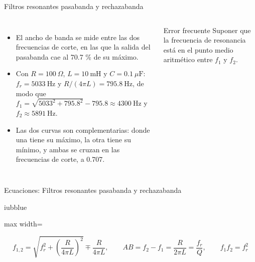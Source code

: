 \documentclass[aspectratio=169,11pt,xcolor={table}]{beamer}
\begin{document}
\begin{frame}{Filtros resonantes pasabanda y rechazabanda}
\begin{columns}[c,onlytextwidth]
\small
\begin{itemize}\setlength{\itemsep}{4pt}
  \item El ancho de banda se mide entre las dos frecuencias de corte, en las que la salida del pasabanda cae al 70.7 \% de su máximo.
  \item Con $R = 100\ \Omega$, $L = 10\ \text{mH}$ y $C = 0.1\ \mu\text{F}$: $f_r = 5033\ \text{Hz}$ y $R/(4\pi L) = 795.8\ \text{Hz}$, de modo que $f_1 = \sqrt{5033^2 + 795.8^2} - 795.8 \approx 4300\ \text{Hz}$ y $f_2 \approx 5891\ \text{Hz}$.
  \item Las dos curvas son complementarias: donde una tiene su máximo, la otra tiene su mínimo, y ambas se cruzan en las frecuencias de corte, a 0.707.
\end{itemize}
\begin{cardO}{Error frecuente}
\footnotesize Suponer que la frecuencia de resonancia está en el punto medio aritmético entre $f_1$ y $f_2$.
\end{cardO}
\end{columns}
\end{frame}

\begin{frame}{{\normalsize Ecuaciones: Filtros resonantes pasabanda y rechazabanda}}
\begin{cajaplana}{iubblue}
\centering
\begin{adjustbox}{max width=\linewidth}
\begin{minipage}{1.47\linewidth}
{\large
\begin{equation*}
  f_{1,2} = \sqrt{f_r^{2} + \left(\frac{R}{4\pi L}\right)^{2}} \mp \frac{R}{4\pi L}, \qquad AB = f_2 - f_1 = \frac{R}{2\pi L} = \frac{f_r}{Q}, \qquad f_1 f_2 = f_r^{2}
\end{equation*}
}
\end{minipage}
\end{adjustbox}
\end{cajaplana}
\end{frame}
\end{document}
